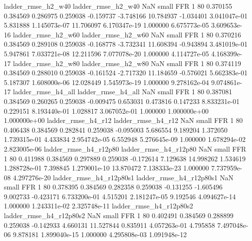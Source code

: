       ladder_rmse_h2_w40       ladder_rmse_h2_w40                   NaN      small      FFR                 1 80 0.370155       0.384569 0.286975       0.259038   -0.159737     -3.748166     10.784937    -1.034401   3.041047e-01  5.831888 1.145073e-07    11.706097   6.170347e-19            1.000000    6.675773e-05        3.609653e-16
      ladder_rmse_h2_w60       ladder_rmse_h2_w60                   NaN      small      FFR                 1 80 0.370216       0.384569 0.289108       0.259038   -0.168778     -3.732341     11.608394    -0.943894   3.481019e-01  5.947861 7.033721e-08    12.211596   7.077078e-20            1.000000    4.114727e-05        4.168399e-17
      ladder_rmse_h2_w80       ladder_rmse_h2_w80                   NaN      small      FFR                 1 80 0.374119       0.384569 0.288010       0.259038   -0.161524     -2.717320     11.184659    -0.576021   5.662383e-01  5.187307 1.608000e-06    12.028449   1.545973e-19            1.000000    9.278162e-04        9.074861e-17
      ladder_rmse_h4_all       ladder_rmse_h4_all                   NaN      small      FFR                 1 80 0.387081       0.384569 0.260265       0.259038   -0.009475      0.653031      0.473816     0.147233   8.833231e-01  0.229151 8.193440e-01     1.028817   3.067052e-01            1.000000    1.000000e+00        1.000000e+00
      ladder_rmse_h4_r12       ladder_rmse_h4_r12                   NaN      small      FFR                 1 80 0.406438       0.384569 0.282841       0.259038   -0.095003      5.686554      9.189204     1.372050   1.739315e-01  4.433834 2.954742e-05     6.552948   5.276645e-09            1.000000    1.678294e-02        2.823005e-06
   ladder_rmse_h4_r12p80    ladder_rmse_h4_r12p80                   NaN      small      FFR                 1 80 0.411988       0.384569 0.297889       0.259038   -0.172614      7.129638     14.998262     1.534619   1.288728e-01  7.398845 1.279001e-10    13.870472   7.138333e-23            1.000000    7.737959e-08        4.297276e-20
 ladder_rmse_h4_r12p80s1  ladder_rmse_h4_r12p80s1                   NaN      small      FFR                 1 80 0.378395       0.384569 0.282358       0.259038   -0.131255     -1.605496      9.002733    -0.423171   6.733200e-01  4.515201 2.181247e-05     9.192546   4.094627e-14            1.000000    1.243311e-02        2.325748e-11
 ladder_rmse_h4_r12p80s2  ladder_rmse_h4_r12p80s2                   NaN      small      FFR                 1 80 0.402491       0.384569 0.288899       0.259038   -0.142933      4.660131     11.527844     0.835911   4.057263e-01  4.795858 7.497048e-06     9.878181   1.899040e-15            1.000000    4.295808e-03        1.091948e-12
